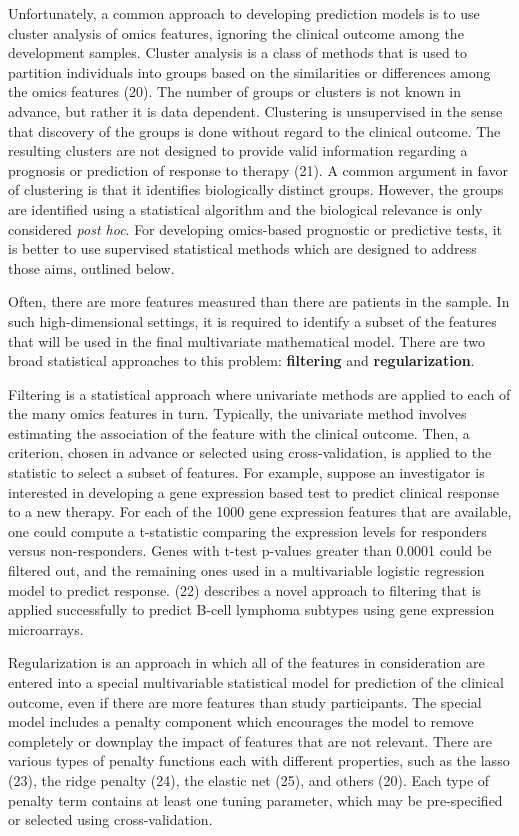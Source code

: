 \documentclass[11pt]{article}
\begin{document}
Unfortunately, a common approach to developing prediction models is to
use cluster analysis of omics features, ignoring the clinical outcome
among the development samples. Cluster analysis is a class of methods
that is used to partition individuals into groups based on the
similarities or differences among the omics features (20). The number of
groups or clusters is not known in advance, but rather it is data
dependent. Clustering is unsupervised in the sense that discovery of the
groups is done without regard to the clinical outcome. The resulting
clusters are not designed to provide valid information regarding a
prognosis or prediction of response to therapy (21). A common argument
in favor of clustering is that it identifies biologically distinct
groups. However, the groups are identified using a statistical algorithm
and the biological relevance is only considered \emph{post hoc}. For
developing omics-based prognostic or predictive tests, it is better to
use supervised statistical methods which are designed to address those
aims, outlined below.

Often, there are more features measured than there are patients in the
sample. In such high-dimensional settings, it is required to identify a
subset of the features that will be used in the final multivariate
mathematical model. There are two broad statistical approaches to this
problem: \textbf{filtering} and \textbf{regularization}.

Filtering is a statistical approach where univariate methods are applied
to each of the many omics features in turn. Typically, the univariate
method involves estimating the association of the feature with the
clinical outcome. Then, a criterion, chosen in advance or selected using
cross-validation, is applied to the statistic to select a subset of
features. For example, suppose an investigator is interested in
developing a gene expression based test to predict clinical response to
a new therapy. For each of the 1000 gene expression features that are
available, one could compute a t-statistic comparing the expression
levels for responders versus non-responders. Genes with t-test p-values
greater than 0.0001 could be filtered out, and the remaining ones used
in a multivariable logistic regression model to predict response. (22)
describes a novel approach to filtering that is applied successfully to
predict B-cell lymphoma subtypes using gene expression microarrays.

Regularization is an approach in which all of the features in
consideration are entered into a special multivariable statistical model
for prediction of the clinical outcome, even if there are more features
than study participants. The special model includes a penalty component
which encourages the model to remove completely or downplay the impact
of features that are not relevant. There are various types of penalty
functions each with different properties, such as the lasso (23), the
ridge penalty (24), the elastic net (25), and others (20). Each type of
penalty term contains at least one tuning parameter, which may be
pre-specified or selected using cross-validation.
\end{document}
